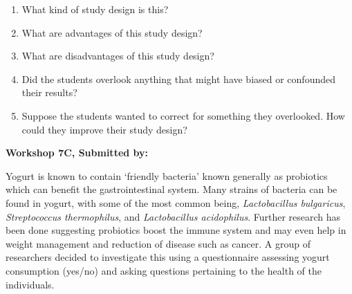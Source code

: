 \documentclass[11pt]{book}\usepackage[]{graphicx}\usepackage[]{color}
\begin{document}
\begin{exercises}
\begin{exercise}
\begin{enumerate}
  \item What kind of study design is this?
  \item What are advantages of this study design?
  \item What are disadvantages of this study design?
  \item Did the students overlook anything that might have biased or confounded their results?
  \item Suppose the students wanted to correct for something they overlooked. How could they improve their study design?
\end{enumerate}

\end{exercise}
\begin{solution}  %

\end{solution}

\clearpage

    \begin{exercise}  %

    \begin{center}
\begin{flushleft}\textbf{\large \hfill Workshop 7C, Submitted by: }\end{flushleft}

\end{center}

Yogurt is known to contain `friendly bacteria' known generally as probiotics which can benefit the gastrointestinal system.  Many strains of bacteria can be found in yogurt, with some of the most common being, \textit{Lactobacillus bulgaricus}, \textit{Streptococcus thermophilus}, and \textit{Lactobacillus acidophilus}.  Further research has been done suggesting probiotics boost the immune system and may even help in weight management and reduction of disease such as cancer.  A group of researchers decided to investigate this using a questionnaire assessing yogurt consumption (yes/no) and asking questions pertaining to the health of the individuals.


\end{exercise}
\end{exercises}
\end{document}
